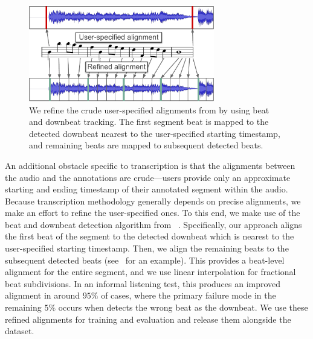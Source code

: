 \begin{figure}
    \centering
    \includegraphics[width=8.1cm]{figs/alignment.pdf}
    \caption{We refine the crude user-specified alignments from \hooktheory{} by using beat and downbeat tracking. The first segment beat is mapped to the detected downbeat nearest to the user-specified starting timestamp, and remaining beats are mapped to subsequent detected beats.}
 \label{fig:alignment}
\end{figure}

An additional obstacle specific to transcription is that the alignments between the audio and the annotations are crude---users provide only an approximate starting and ending timestamp of their annotated segment within the audio. 
Because transcription methodology generally depends on precise alignments, we make an effort to refine the user-specified ones. 
To this end, we make use of the beat and downbeat detection algorithm from \madmom{}~\cite{bock2016joint,bock2016madmom}. 
Specifically, our approach aligns the first beat of the segment to the detected downbeat which is nearest to the user-specified starting timestamp. 
Then, we align the remaining beats to the subsequent detected beats (see~ for an example). 
This provides a beat-level alignment for the entire segment, and we use linear interpolation for fractional beat subdivisions. 
In an informal listening test, this produces an improved alignment in around $95\%$ of cases, where the primary failure mode in the remaining $5\%$ occurs when \madmom{} detects the wrong beat as the downbeat. 
We use these refined alignments for training and evaluation and release them alongside the dataset.
